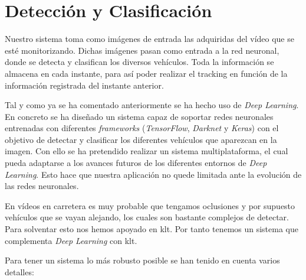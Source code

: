 \section{Detección y Clasificación}

Nuestro sistema toma como imágenes de entrada las adquiridas del vídeo que se esté monitorizando. Dichas imágenes pasan como entrada a la red neuronal, donde se detecta y clasifican los diversos vehículos. Toda la información se almacena en cada instante, para así poder realizar el tracking en función de la información registrada del instante anterior.

Tal y como ya se ha comentado anteriormente se ha hecho uso de \textit{Deep Learning}. En concreto se ha diseñado un sistema capaz de soportar redes neuronales entrenadas con diferentes \textit{frameworks} (\textit{TensorFlow}, \textit{Darknet} y \textit{Keras}) con el objetivo de detectar y clasificar los diferentes vehículos que aparezcan en la imagen. Con ello se ha pretendido realizar un sistema multiplataforma, el cual pueda adaptarse a los avances futuros de los diferentes entornos de \textit{Deep Learning}. Esto hace que nuestra aplicación no quede limitada ante la evolución de las redes neuronales.

En vídeos en carretera es muy probable que tengamos oclusiones y por supuesto vehículos que se vayan alejando, los cuales son bastante complejos de detectar. Para solventar esto nos hemos apoyado en \acrfull{klt}. Por tanto tenemos un sistema que complementa \textit{Deep Learning} con \acrshort{klt}. 

Para tener un sistema lo más robusto posible se han tenido en cuenta varios detalles:


